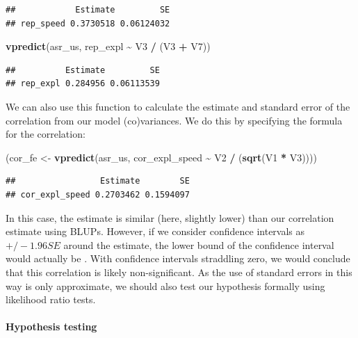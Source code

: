 \documentclass[
  12pt,
]{book}
\newenvironment{Shaded}{\begin{snugshade}}{\end{snugshade}}
\newcommand{\KeywordTok}[1]{\textcolor[rgb]{0.13,0.29,0.53}{\textbf{#1}}}
\newcommand{\NormalTok}[1]{#1}
\newcommand{\OperatorTok}[1]{\textcolor[rgb]{0.81,0.36,0.00}{\textbf{#1}}}
\newcommand{\StringTok}[1]{\textcolor[rgb]{0.31,0.60,0.02}{#1}}
\begin{document}
\begin{verbatim}
##            Estimate         SE
## rep_speed 0.3730518 0.06124032
\end{verbatim}

\begin{Shaded}
\begin{Highlighting}[]
\KeywordTok{vpredict}\NormalTok{(asr\_us, rep\_expl }\OperatorTok{\textasciitilde{}}\StringTok{ }\NormalTok{V3 }\OperatorTok{/}\StringTok{ }\NormalTok{(V3 }\OperatorTok{+}\StringTok{ }\NormalTok{V7))}
\end{Highlighting}
\end{Shaded}

\begin{verbatim}
##          Estimate         SE
## rep_expl 0.284956 0.06113539
\end{verbatim}

We can also use this function to calculate the estimate and standard error of the correlation from our model (co)variances. We do this by specifying the formula for the correlation:

\begin{Shaded}
\begin{Highlighting}[]
\NormalTok{(cor\_fe \textless{}{-}}\StringTok{ }\KeywordTok{vpredict}\NormalTok{(asr\_us, cor\_expl\_speed }\OperatorTok{\textasciitilde{}}\StringTok{ }\NormalTok{V2 }\OperatorTok{/}\StringTok{ }\NormalTok{(}\KeywordTok{sqrt}\NormalTok{(V1 }\OperatorTok{*}\StringTok{ }\NormalTok{V3))))}
\end{Highlighting}
\end{Shaded}

\begin{verbatim}
##                 Estimate        SE
## cor_expl_speed 0.2703462 0.1594097
\end{verbatim}

In this case, the estimate is similar (here, slightly lower) than our correlation estimate using BLUPs.
However, if we consider confidence intervals as \(+/- 1.96SE\) around the estimate, the lower bound of the confidence interval would actually be .
With confidence intervals straddling zero, we would conclude that this correlation is likely non-significant.
As the use of standard errors in this way is only approximate, we should also test our hypothesis formally using likelihood ratio tests.

\hypertarget{hypothesis-testing}{%
\paragraph{Hypothesis testing}\label{hypothesis-testing}}
\end{document}
